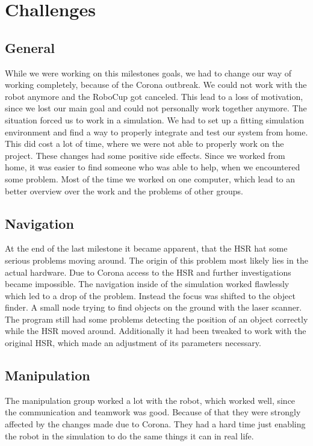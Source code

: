\documentclass[main.tex]{subfiles}
\begin{document}
	
	\chapter{Challenges}

\section{General}

While we were working on this milestones goals, we had to change our way of working completely, because of the Corona outbreak.
We could not work with the robot anymore and the RoboCup got canceled. This lead to a loss of motivation, since we lost our main goal and could not personally work together anymore.
The situation forced us to work in a simulation. We had to set up a fitting simulation environment and find a way to properly integrate and test our system from home. This did cost a lot of time, where we were not able to properly work on the project.
These changes had some positive side effects. Since we worked from home, it was easier to find someone who was able to help, when we encountered some problem. Most of the time we worked on one computer, which lead to an better overview over the work and the problems of other groups.

\section{Navigation}
At the end of the last milestone it became apparent, that the HSR hat some serious problems moving around. The origin of this problem most likely lies in the actual hardware. Due to Corona access to the HSR and further investigations became impossible. The navigation inside of the simulation worked flawlessly which led to a drop of the problem. Instead the focus was shifted to the object finder. A small node trying to find objects on the ground with the laser scanner. The program still had some problems detecting the position of an object correctly while the HSR moved around. Additionally it had been tweaked to work with the original HSR, which made an adjustment of its parameters necessary.  

\section{Manipulation}

The manipulation group worked a lot with the robot, which worked well, since the communication and teamwork was good.
Because of that they were strongly affected by the changes made due to Corona. They had a hard time just enabling the robot in the simulation to do the same things it can in real life.
\end{document}
